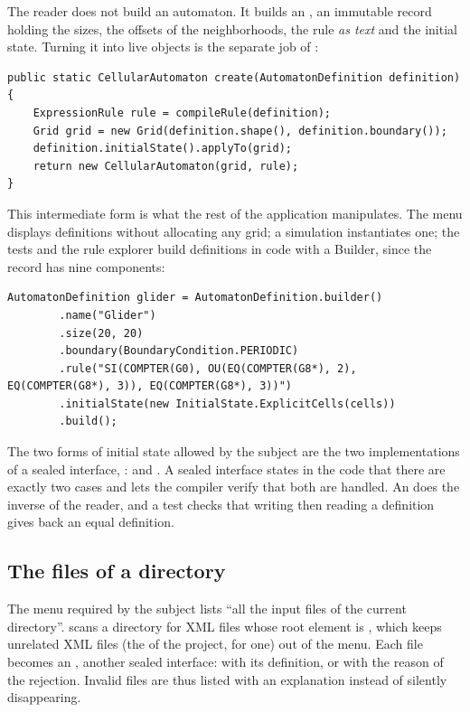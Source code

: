 The reader does not build an automaton. It builds an , an immutable
record holding the sizes, the offsets of the neighborhoods, the rule \emph{as text} and the
initial state. Turning it into live objects is the separate job of :

\begin{lstlisting}
public static CellularAutomaton create(AutomatonDefinition definition) {
    ExpressionRule rule = compileRule(definition);
    Grid grid = new Grid(definition.shape(), definition.boundary());
    definition.initialState().applyTo(grid);
    return new CellularAutomaton(grid, rule);
}
\end{lstlisting}

This intermediate form is what the rest of the application manipulates. The menu displays
definitions without allocating any grid; a simulation instantiates one; the tests and the rule
explorer build definitions in code with a Builder, since the record has nine components:

\begin{lstlisting}
AutomatonDefinition glider = AutomatonDefinition.builder()
        .name("Glider")
        .size(20, 20)
        .boundary(BoundaryCondition.PERIODIC)
        .rule("SI(COMPTER(G0), OU(EQ(COMPTER(G8*), 2), EQ(COMPTER(G8*), 3)), EQ(COMPTER(G8*), 3))")
        .initialState(new InitialState.ExplicitCells(cells))
        .build();
\end{lstlisting}

The two forms of initial state allowed by the subject are the two implementations of a sealed
interface, :  and . A sealed interface
states in the code that there are exactly two cases and lets the compiler verify that both are
handled. An  does the inverse of the reader, and a test checks that
writing then reading a definition gives back an equal definition.

\subsection{The files of a directory}

The menu required by the subject lists ``all the input files of the current directory''.
 scans a directory for XML files whose root element is
, which keeps unrelated XML files (the  of the project, for one)
out of the menu. Each file becomes an , another sealed interface:  with
its definition, or  with the reason of the rejection. Invalid files are thus listed
with an explanation instead of silently disappearing.

